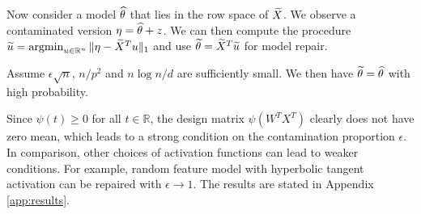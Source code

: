 Now consider a model $\widehat{\theta}$ that lies in the row space of $\widetilde{X}$. We observe a contaminated version $\eta=\widehat{\theta}+z$.
We can then compute the procedure $\widetilde{u}=\mathop{\rm argmin}_{u\in\mathbb{R}^n}\|\eta-\widetilde{X}^Tu\|_1$ and use $\widetilde{\theta}=\widetilde{X}^T\widetilde{u}$ for model repair.

\begin{corollary}\label{cor:repair-rf-relu}
Assume $\epsilon\sqrt{n}$, $n/p^2$ and $n\log n/d$ are sufficiently small. We then have $\widetilde{\theta}=\widehat{\theta}$ with high probability.
\end{corollary}

Since $\psi(t)\geq 0$ for all $t\in\mathbb{R}$, the design matrix $\psi(W^TX^T)$ clearly does not have zero mean, which leads to a strong condition on the contamination proportion $\epsilon$. In comparison, other choices of activation functions can lead to weaker conditions. For example, random feature model with hyperbolic tangent activation can be repaired with $\epsilon\rightarrow 1$. The results are stated in Appendix \ref{app:results}.
